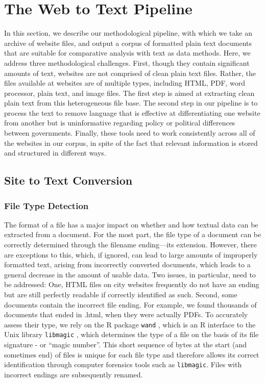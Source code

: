 \documentclass[11pt]{article}
\begin{document}
\section{The Web to Text Pipeline}
In this section, we describe our methodological pipeline, with which we take an archive of website files, and output a corpus of formatted plain text documents that are suitable for comparative analysis with text as data methods. Here, we address three methodological challenges.  First, though they contain significant amounts of text, websites are not comprised of clean plain text files. Rather, the files available at websites are of multiple types, including HTML, PDF, word processor, plain text, and image files. The first step is aimed at extracting clean plain text from this heterogeneous file base. The second step in our pipeline is to process the text to remove language that is effective at differentiating one website from another but is uninformative regarding policy or political differences between governments. Finally, these tools need to work consistently across all of the websites in our corpus, in spite of the fact that relevant information is stored and structured in different ways.%

\subsection{Site to Text Conversion}
\subsubsection{File Type Detection}
The format of a file has a major impact on whether and how textual data can be extracted from a document. For the most part, the file type of a document can be correctly determined through the filename ending---its extension. However, there are exceptions to this, which, if ignored, can lead to large amounts of improperly formatted text, arising from incorrectly converted documents, which leads to a general decrease in the amount of usable data. Two issues, in particular, need to be addressed: One, HTML files on city websites frequently do not have an ending but are still perfectly readable if correctly identified as such. Second, some documents contain the incorrect file ending. For example, we found thousands of documents that ended in .html, when they were actually PDFs. To accurately assess their type, we rely on the R package \texttt{wand} \citep{wand}, which is an R interface to the Unix library \texttt{libmagic} \citep{darwin2008libmagic}, which determines the type of a file on the basis of its file signature - or ``magic number''. This short sequence of bytes at the start (and sometimes end) of files is unique for each file type and therefore allows its correct identification through computer forensics tools such as \texttt{libmagic}. Files with incorrect endings are subsequently renamed.
\end{document}
